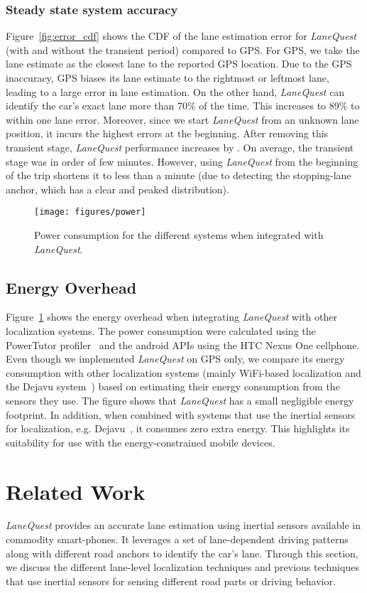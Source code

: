 \documentclass[10pt, conference, compsocconf]{IEEEtran}
\def \sys {\textit{LaneQuest}}
\newcommand{\figscale}{0.7}
\begin{document}
\subsubsection{Steady state system accuracy}
Figure~\ref{fig:error_cdf} shows the CDF of the lane estimation error for \sys{} (with and without the transient period) compared to GPS. For GPS, we take the lane estimate as the closest lane to the reported GPS location. Due to the GPS inaccuracy, GPS biases its lane estimate to the rightmost or leftmost lane, leading to a large error in lane estimation. On the other hand, \sys{} can identify the car's exact lane more than 70\% of the time. This increases to 89\% to within one lane error. Moreover, since we start \sys{} from an unknown lane position, it incurs the highest errors at the beginning. After removing this transient stage, \sys{} performance increases by .  On average, the transient stage was in order of few minutes. However, using \sys{} from the beginning of the trip shortens it  to less than a minute (due to detecting the stopping-lane anchor, which has a clear and peaked distribution).
\begin{figure}[!t]
\centering
\texttt{[image: figures/power]}
\caption{Power consumption for the different systems when integrated with \sys{}.}
\label{fig:power}
\end{figure}
\subsection{Energy Overhead}
Figure~\ref{fig:power} shows the energy overhead when integrating \sys{} with other localization systems. The power consumption were calculated using the PowerTutor profiler~\cite{zhang2010accurate} and the android APIs using the HTC Nexus One cellphone. Even though we implemented \sys{} on GPS only, we compare its energy consumption with other localization systems (mainly WiFi-based localization and the Dejavu system~\cite{aly2013dejavu}) based on estimating their energy consumption from the sensors they use. The figure shows that \sys{} has a small negligible energy footprint. In addition, when combined with systems that use the inertial sensors for localization, e.g. Dejavu~\cite{aly2013dejavu}, it consumes zero extra energy. This highlights its suitability for use with the energy-constrained mobile devices.
\section{Related Work}\label{sec:relwork}\sys{} provides an accurate lane estimation using inertial sensors available in commodity smart-phones. It leverages a set of lane-dependent driving patterns along with different road anchors to identify the car's lane. Through this section, we discuss the different lane-level localization techniques and previous techniques that use inertial sensors for sensing different road parts or driving behavior.
\end{document}

